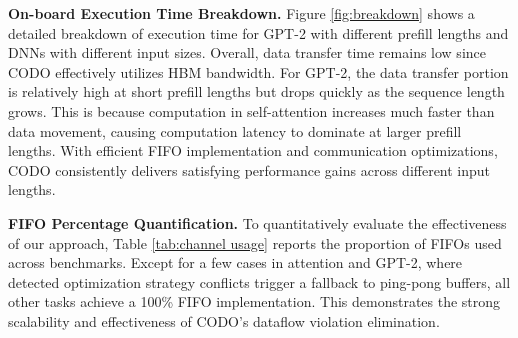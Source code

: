 \documentclass[conference]{IEEEtran}
\begin{document}
\textbf{On-board Execution Time Breakdown.} 
Figure \ref{fig:breakdown} shows a detailed breakdown of execution time for GPT-2 with different prefill lengths and DNNs with different input sizes. Overall, data transfer time remains low since CODO effectively utilizes HBM bandwidth. For GPT-2, the data transfer portion is relatively high at short prefill lengths but drops quickly as the  sequence length grows. This is because computation in self-attention increases much faster than data movement, causing computation latency to dominate at larger prefill lengths. With efficient FIFO implementation and communication optimizations, CODO consistently delivers satisfying performance gains across different input lengths.



\textbf{FIFO Percentage Quantification.}\label{Comparison of Dominant buffer Types}
To quantitatively evaluate the effectiveness of our approach, Table \ref{tab:channel usage} reports the proportion of FIFOs used across benchmarks. Except for a few cases in attention and GPT-2, where detected optimization strategy conflicts trigger a fallback to ping-pong buffers, all other tasks achieve a 100\% FIFO implementation. This demonstrates the strong scalability and effectiveness of CODO's dataflow violation elimination.

\end{document}

